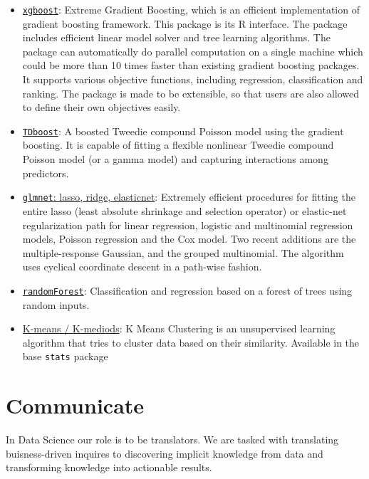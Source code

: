 \documentclass[]{book}
\providecommand{\tightlist}{%
  \setlength{\itemsep}{0pt}\setlength{\parskip}{0pt}}
\begin{document}
\begin{itemize}
\tightlist
\item
  \href{https://xgboost.readthedocs.io/en/latest/}{\texttt{xgboost}}:
  Extreme Gradient Boosting, which is an efficient implementation of
  gradient boosting framework. This package is its R interface. The
  package includes efficient linear model solver and tree learning
  algorithms. The package can automatically do parallel computation on a
  single machine which could be more than 10 times faster than existing
  gradient boosting packages. It supports various objective functions,
  including regression, classification and ranking. The package is made
  to be extensible, so that users are also allowed to define their own
  objectives easily.
\item
  \href{https://cran.r-project.org/web/packages/TDboost/TDboost.pdf}{\texttt{TDboost}}:
  A boosted Tweedie compound Poisson model using the gradient boosting.
  It is capable of fitting a flexible nonlinear Tweedie compound Poisson
  model (or a gamma model) and capturing interactions among predictors.
\item
  \href{https://web.stanford.edu/~hastie/glmnet/glmnet_alpha.html}{\texttt{glmnet}:
  lasso, ridge, elasticnet}: Extremely efficient procedures for fitting
  the entire lasso (least absolute shrinkage and selection operator) or
  elastic-net regularization path for linear regression, logistic and
  multinomial regression models, Poisson regression and the Cox model.
  Two recent additions are the multiple-response Gaussian, and the
  grouped multinomial. The algorithm uses cyclical coordinate descent in
  a path-wise fashion.
\item
  \href{https://cran.r-project.org/web/packages/randomForest/randomForest.pdf}{\texttt{randomForest}}:
  Classification and regression based on a forest of trees using random
  inputs.
\item
  \href{http://www.statmethods.net/advstats/cluster.html}{K-means /
  K-mediods}: K Means Clustering is an unsupervised learning algorithm
  that tries to cluster data based on their similarity. Available in the
  base \texttt{stats} package
\end{itemize}

\chapter{Communicate}\label{communicate}

In Data Science our role is to be translators. We are tasked with
translating buisness-driven inquires to discovering implicit knowledge
from data and transforming knowledge into actionable results.
\end{document}
